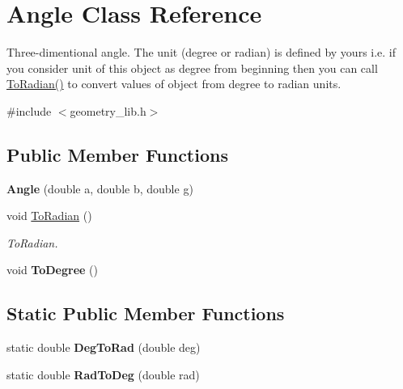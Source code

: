 \hypertarget{class_angle}{}\section{Angle Class Reference}
\label{class_angle}


Three-\/dimentional angle. The unit (degree or radian) is defined by yours i.\+e. if you consider unit of this object as degree from beginning then you can call \mbox{\hyperlink{class_angle_a72dd5f472528fe9edaaafaf91d71670e}{To\+Radian()}} to convert values of object from degree to radian units.  




{\ttfamily \#include $<$geometry\+\_\+lib.\+h$>$}

\subsection*{Public Member Functions}
\begin{DoxyCompactItemize}
\item 
\mbox{\label{class_angle_a3b9936babc6a849c86cea39317302184}} 
{\bfseries Angle} (double a, double b, double g)
\item 
\mbox{\label{class_angle_a72dd5f472528fe9edaaafaf91d71670e}} 
void \mbox{\hyperlink{class_angle_a72dd5f472528fe9edaaafaf91d71670e}{To\+Radian}} ()
\begin{DoxyCompactList}\small\item\em To\+Radian. \end{DoxyCompactList}\item 
\mbox{\label{class_angle_ab79580abdca9837cf9028651ba9aee80}} 
void {\bfseries To\+Degree} ()
\end{DoxyCompactItemize}
\subsection*{Static Public Member Functions}
\begin{DoxyCompactItemize}
\item 
\mbox{\label{class_angle_aa99f6ac9b7eb6349a69db893612e23de}} 
static double {\bfseries Deg\+To\+Rad} (double deg)
\item 
\mbox{\label{class_angle_ad365186733ffaa5cb9870379366e9a1e}} 
static double {\bfseries Rad\+To\+Deg} (double rad)
\end{DoxyCompactItemize}
